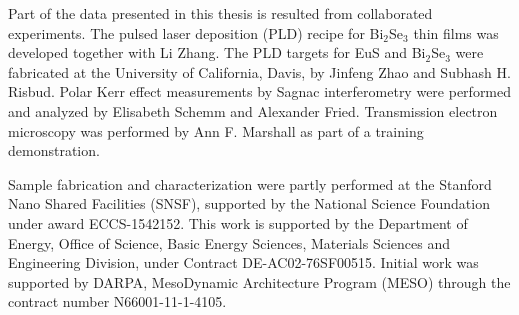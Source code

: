 Part of the data presented in this thesis is resulted from collaborated experiments. The pulsed laser deposition (PLD) recipe for Bi$_2$Se$_3$ thin films was developed together with Li Zhang. The PLD targets for EuS and Bi$_2$Se$_3$ were fabricated at the University of California, Davis, by Jinfeng Zhao and Subhash H. Risbud. Polar Kerr effect measurements by Sagnac interferometry were performed and analyzed by Elisabeth Schemm and Alexander Fried. Transmission electron microscopy was performed by Ann F. Marshall as part of a training demonstration.

Sample fabrication and characterization were partly performed at the Stanford Nano Shared Facilities (SNSF), supported by the National Science Foundation under award ECCS-1542152.  This work is supported by the Department of Energy,  Office of Science, Basic Energy Sciences, Materials Sciences and Engineering Division, under Contract DE-AC02-76SF00515. Initial work was supported by DARPA, MesoDynamic Architecture Program (MESO) through the contract number N66001-11-1-4105.